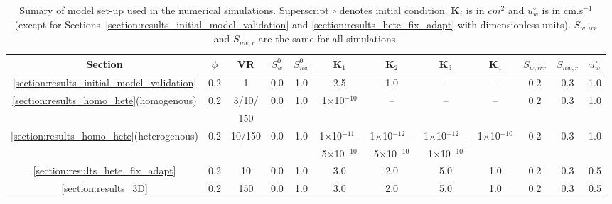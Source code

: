 \begin{landscape}
\begin{table}
  \begin{tabular}{c | c c  c  c  c  c  c  c  c  c   c}
    \hline
      {\bf Section} & $\phi$ & VR  & $S^{0}_{w}$ & $S^{0}_{nw}$ & $\mathbf{K}_{1}$ & $\mathbf{K}_{2}$ & $\mathbf{K}_{3}$ & $\mathbf{K}_{4}$ & $S_{w,irr}$ & $S_{nw,r}$ & $u^{\circ}_{w}$ \\ 
    \hline
     \ref{section:results_initial_model_validation} & 0.2 & 1 & 0.0 & 1.0 & 2.5 & 1.0 & -- & -- & 0.2 & 0.3 & 1.0 \\
     \ref{section:results_homo_hete}(homogenous)  & 0.2 & 3/10/ & 0.0 & 1.0 & 1$\times$10$^{-10}$ & -- & -- & -- & 0.2 & 0.3 & 1.0  \\
                                                  &     & 150 &     &     &                    &     &     &     &     &     &      \\
     \ref{section:results_homo_hete}(heterogenous) & 0.2 & 10/150 & 0.0 & 1.0 & 1$\times$10$^{-11} $-- & 1$\times$10$^{-12}$ -- & 1$\times$10$^{-12}$ -- & 1$\times$10$^{-10}$ & 0.2  & 0.3 & 1.0 \\
      &   &  &  &  & 5$\times$10$^{-10}$ & 5$\times$10$^{-10}$ & 1$\times$10$^{-10}$  &  &  &  & \\
     \ref{section:results_hete_fix_adapt}  & 0.2 & 10 & 0.0 & 1.0  & 3.0 & 2.0 & 5.0 & 1.0 & 0.2 & 0.3 & 0.5  \\
     \ref{section:results_3D}  & 0.2 & 150 & 0.0 & 1.0 & 3.0 & 2.0 & 5.0 & 1.0 & 0.2  & 0.3 & 0.5  \\
     \hline
   \end{tabular}
   \caption{Sumary of model set-up used in the numerical simulations. Superscript $\circ$ denotes initial condition. $\mathbf{K}_{i}$ is in $cm^{2}$ and $u^{\circ}_{w}$ is in cm.s$^{-1}$ (except for Sections~\ref{section:results_initial_model_validation} and \ref{section:results_hete_fix_adapt} with dimensionless units). $S_{w,irr}$ and $S_{nw,r}$ are the same for all simulations. }
\label{table:setup}
\end{table}
\end{landscape}
\clearpage


